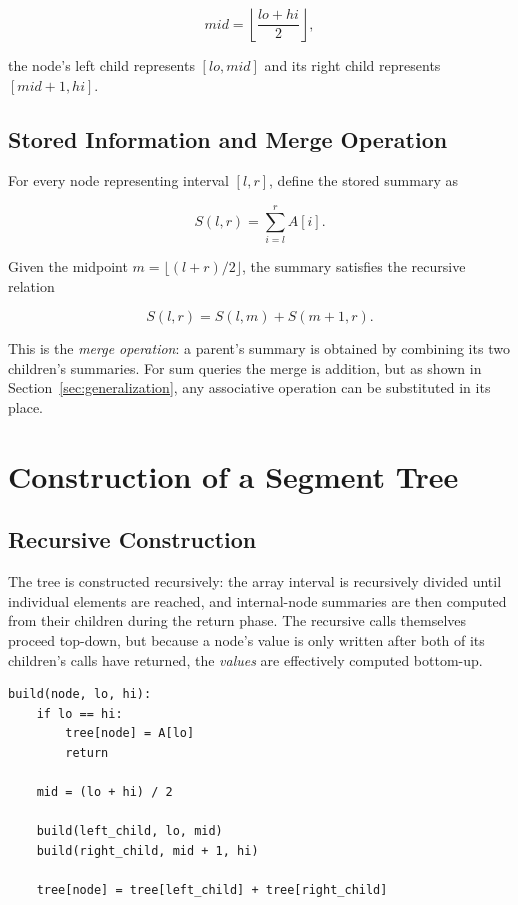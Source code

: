 \documentclass[11pt]{article}
\begin{document}
\begin{equation}
mid = \left\lfloor \frac{lo+hi}{2} \right\rfloor,
\end{equation}

the node's left child represents $[lo, mid]$ and its right child represents $[mid+1, hi]$.

\subsection{Stored Information and Merge Operation}
For every node representing interval $[l,r]$, define the stored summary as

\begin{equation}
S(l,r) = \sum_{i=l}^{r} A[i].
\end{equation}

Given the midpoint $m = \lfloor (l+r)/2 \rfloor$, the summary satisfies the recursive relation

\begin{equation}
S(l,r) = S(l,m) + S(m+1,r).
\label{eq:merge}
\end{equation}

This is the \emph{merge operation}: a parent's summary is obtained by combining its two children's summaries. For sum queries the merge is addition, but as shown in Section~\ref{sec:generalization}, any associative operation can be substituted in its place.

\section{Construction of a Segment Tree}

\subsection{Recursive Construction}
The tree is constructed recursively: the array interval is recursively divided until individual elements are reached, and internal-node summaries are then computed from their children during the return phase. The recursive calls themselves proceed top-down, but because a node's value is only written after both of its children's calls have returned, the \emph{values} are effectively computed bottom-up.

\begin{lstlisting}
build(node, lo, hi):
    if lo == hi:
        tree[node] = A[lo]
        return

    mid = (lo + hi) / 2

    build(left_child, lo, mid)
    build(right_child, mid + 1, hi)

    tree[node] = tree[left_child] + tree[right_child]
\end{lstlisting}
\end{document}
